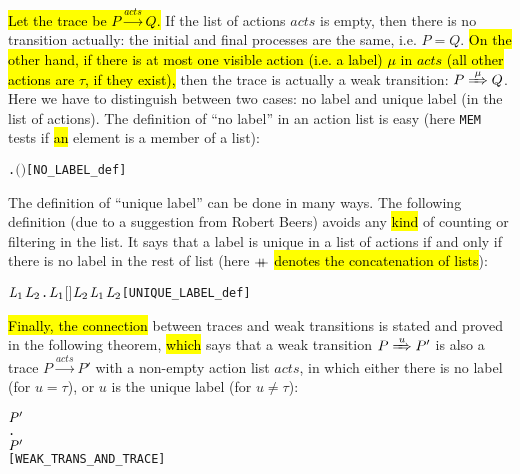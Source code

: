 \hl{Let the trace be $P\overset{acts}{\longrightarrow}Q$.}
If the list of actions $acts$ is empty, then there is no transition
actually: the initial and final processes are the same, i.e. $P = Q$.
\hl{On the other hand, if there is at most one visible action (i.e. a
label) $\mu$ in $acts$ (all other actions are $\tau$, if they exist),}
then the trace is actually a weak transition: $P \Arr{\mu} Q$.
Here we have to distinguish between two cases: no label and unique label (in
the list of actions). The definition of ``no
label'' in an action list is easy (here \texttt{MEM} tests if \hl{an} element is a member of a list):
\begin{alltt}
     \HOLTokenDefEquality{} \HOLSymConst{\HOLTokenNeg{}}\HOLSymConst{\HOLTokenExists{}}.  \ensuremath{(} \ensuremath{)} \hfill{[NO_LABEL_def]}
\end{alltt}

The definition of ``unique label'' can be done in many ways. The
following definition (due to a suggestion from Robert Beers)
avoids any \hl{kind} of counting or filtering in the list.
It says that a label is unique in a list of actions if and only if there is no
label in the rest of list (here $\mathbin{+\mkern-10mu+}$ \hl{denotes the concatenation
of lists}):
\begin{alltt}
      \HOLTokenDefEquality{}
     \HOLSymConst{\HOLTokenExists{}}\ensuremath{\HOLBoundVar{L}\sb{\mathrm{1}}} \ensuremath{\HOLBoundVar{L}\sb{\mathrm{2}}}. \ensuremath{\HOLBoundVar{L}\sb{\mathrm{1}}} \HOLSymConst{\HOLTokenDoublePlus} \ensuremath{[}\ensuremath{]} \HOLSymConst{\HOLTokenDoublePlus} \ensuremath{\HOLBoundVar{L}\sb{\mathrm{2}}} \HOLSymConst{\ensuremath{=}}  \HOLSymConst{\HOLTokenConj{}}  \ensuremath{\HOLBoundVar{L}\sb{\mathrm{1}}} \HOLSymConst{\HOLTokenConj{}}  \ensuremath{\HOLBoundVar{L}\sb{\mathrm{2}}}\hfill{[UNIQUE_LABEL_def]}
\end{alltt}

\hl{Finally, the connection} between traces and weak transitions is stated
and proved in the following theorem, \hl{which} says that a weak transition $P \Arr{u} P'$ is also a
trace $P\overset{acts}{\longrightarrow}P'$ with a
 non-empty action list $acts$, in which either there is no label (for $u = \tau$), or 
$u$ is the unique label (for $u \neq \tau$):
\begin{alltt}
\HOLTokenTurnstile{}  \HOLTokenWeakTransBegin{}\HOLTokenWeakTransEnd \ensuremath{\HOLFreeVar{P}\sp{\prime}} \HOLSymConst{\HOLTokenEquiv{}}
   \HOLSymConst{\HOLTokenExists{}}.
          \ensuremath{\HOLFreeVar{P}\sp{\prime}} \HOLSymConst{\HOLTokenConj{}} \HOLSymConst{\HOLTokenNeg{}}  \HOLSymConst{\HOLTokenConj{}}
         \HOLSymConst{\ensuremath{=}} \HOLSymConst{\ensuremath{\tau}}       \hfill{[WEAK_TRANS_AND_TRACE]}
\end{alltt}

